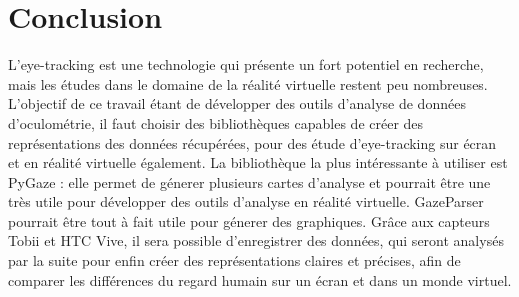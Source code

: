 \documentclass[12pt]{article}
\begin{document}

\section{Conclusion}

L'eye-tracking est une technologie qui présente un fort potentiel en recherche,
mais les études dans le domaine de la réalité virtuelle restent peu nombreuses.
L'objectif de ce travail étant de développer des outils d'analyse de données
d'oculométrie, il faut choisir des bibliothèques capables de créer des
représentations des données récupérées, pour des étude d'eye-tracking sur écran
et en réalité virtuelle également. La bibliothèque la plus intéressante à
utiliser est PyGaze : elle permet de génerer plusieurs cartes d'analyse et
pourrait être une très utile pour développer des outils d'analyse en réalité
virtuelle. GazeParser pourrait être tout à fait utile pour génerer des
graphiques. Grâce aux capteurs Tobii et HTC Vive, il sera possible
d'enregistrer des données, qui seront analysés par la suite pour enfin créer
des représentations claires et précises, afin de comparer les différences du
regard humain sur un écran et dans un monde virtuel.




\end{document}
